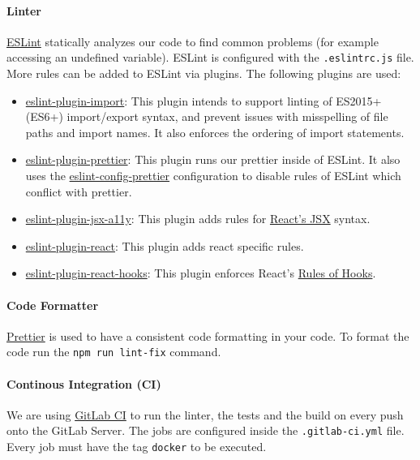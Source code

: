 \paragraph{Linter}
\href{https://eslint.org}{ESLint} statically analyzes our code to find common problems (for example accessing an undefined variable). 
ESLint is configured with the \texttt{.eslintrc.js} file. 
More rules can be added to ESLint via plugins. 
The following plugins are used:
\begin{itemize}
    \item \href{https://www.npmjs.com/package/eslint-plugin-import}{eslint-plugin-import}: 
      This plugin intends to support linting of ES2015+ (ES6+) import/export syntax, and prevent issues with misspelling of file paths and import names. 
      It also enforces the ordering of import statements.
    \item \href{https://www.npmjs.com/package/eslint-plugin-prettier}{eslint-plugin-prettier}:
      This plugin runs our  prettier inside of ESLint. 
      It also uses the \href{https://www.npmjs.com/package/eslint-config-prettier}{eslint-config-prettier} configuration to disable rules of ESLint which conflict with prettier.
    \item \href{https://www.npmjs.com/package/eslint-plugin-jsx-a11y}{eslint-plugin-jsx-a11y}: This plugin adds rules for \href{https://reactjs.org/docs/introducing-jsx.html}{React's JSX} syntax.
    \item \href{https://www.npmjs.com/package/eslint-plugin-react}{eslint-plugin-react}: This plugin adds react specific rules.
    \item \href{https://www.npmjs.com/package/eslint-plugin-react-hooks}{eslint-plugin-react-hooks}: This plugin enforces React's \href{https://reactjs.org/docs/hooks-rules.html}{Rules of Hooks}.
\end{itemize}

\paragraph{Code Formatter}
\label{sec:code-formatter}
\href{https://prettier.io}{Prettier} is used to have a consistent code formatting in your code. 
To format the code run the \texttt{npm run lint-fix} command.

\paragraph{Continous Integration (CI)}
We are using \href{https://mad-srv.informatik.uni-erlangen.de/help/ci/README.md}{GitLab CI} to run the linter, the tests and the build on every push onto the GitLab Server. 
The jobs are configured inside the \texttt{.gitlab-ci.yml} file. 
Every job must have the tag \texttt{docker} to be executed.

